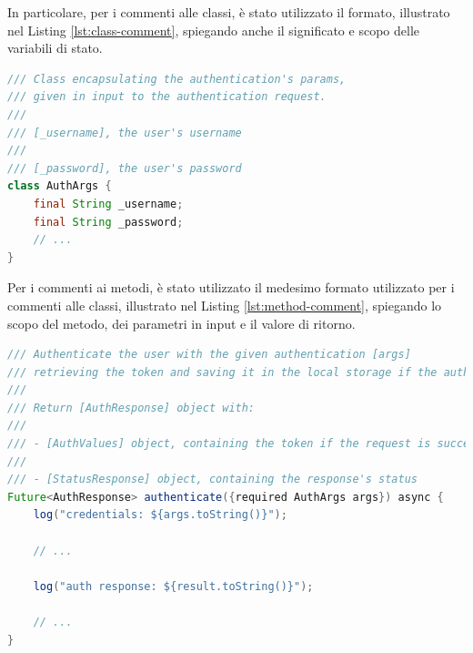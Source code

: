 \noindent In particolare, per i commenti alle classi, è stato utilizzato il formato, illustrato nel Listing \ref{lst:class-comment}, spiegando anche il significato e scopo delle variabili di stato.

\newpage

\begin{lstlisting}[language=Java, caption={Commento classe}, captionpos=b, label={lst:class-comment}]
/// Class encapsulating the authentication's params,
/// given in input to the authentication request.
///
/// [_username], the user's username
///
/// [_password], the user's password
class AuthArgs {
    final String _username;
    final String _password;
    // ...
}
\end{lstlisting}

\noindent Per i commenti ai metodi, è stato utilizzato il medesimo formato utilizzato per i commenti alle classi, illustrato nel Listing \ref{lst:method-comment}, spiegando lo scopo del metodo, dei parametri in input e il valore di ritorno. \\

\begin{lstlisting}[language=Java, caption={Commento metodo}, captionpos=b, label={lst:method-comment}]
/// Authenticate the user with the given authentication [args]
/// retrieving the token and saving it in the local storage if the authentication request is successful.
///
/// Return [AuthResponse] object with:
///
/// - [AuthValues] object, containing the token if the request is successful
///
/// - [StatusResponse] object, containing the response's status
Future<AuthResponse> authenticate({required AuthArgs args}) async {
    log("credentials: ${args.toString()}");

    // ...

    log("auth response: ${result.toString()}");

    // ...
}
\end{lstlisting}
